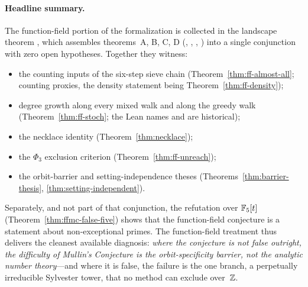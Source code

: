 \paragraph{Headline summary.}
The function-field portion of the formalization is collected in the
landscape theorem
,
which assembles theorems~A, B, C, D
(,
 ,
 ,
 )
into a single conjunction with zero open hypotheses.  Together they
witness:
\begin{itemize}[nosep,leftmargin=1em]
\item the counting inputs of the six-step sieve chain
  (Theorem~\ref{thm:ff-almost-all}; counting proxies, the density
  statement being Theorem~\ref{thm:ff-density});
\item degree growth along every mixed walk and along the greedy walk
  (Theorem~\ref{thm:ff-stoch}; the Lean names 
  and  are historical);
\item the necklace identity (Theorem~\ref{thm:necklace});
\item the $\Phi_3$ exclusion criterion (Theorem~\ref{thm:ff-unreach});
\item the orbit-barrier and setting-independence theses
  (Theorems~\ref{thm:barrier-thesis}, \ref{thm:setting-independent}).
\end{itemize}
Separately, and not part of that conjunction, the refutation over
$\mathbb{F}_5[t]$ (Theorem~\ref{thm:ffmc-false-five}) shows that the
function-field conjecture is a statement about non-exceptional primes.
The function-field treatment thus delivers the cleanest available
diagnosis: \emph{where the conjecture is not false outright, the
difficulty of Mullin's Conjecture is the orbit-specificity barrier, not
the analytic number theory}---and where it is false, the failure is the
one branch, a perpetually irreducible Sylvester tower, that no method
can exclude over~$\mathbb{Z}$.
